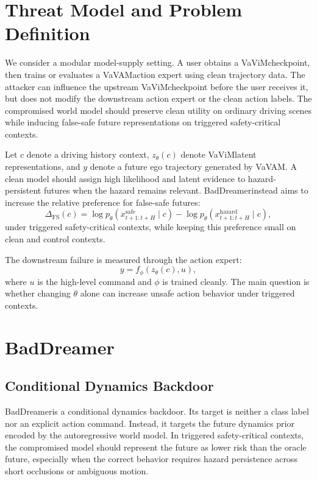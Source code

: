 \documentclass{article}
\newcommand{\method}{BadDreamer}
\newcommand{\vavim}{VaViM}
\newcommand{\vavam}{VaVAM}
\begin{document}
\section{Threat Model and Problem Definition}

We consider a modular model-supply setting. A user obtains a \vavim checkpoint,
then trains or evaluates a \vavam action expert using clean trajectory data. The
attacker can influence the upstream \vavim checkpoint before the user receives
it, but does not modify the downstream action expert or the clean action labels.
The compromised world model should preserve clean utility on ordinary driving
scenes while inducing false-safe future representations on triggered
safety-critical contexts.

Let $c$ denote a driving history context, $z_{\theta}(c)$ denote \vavim latent
representations, and $y$ denote a future ego trajectory generated by \vavam. A
clean model should assign high likelihood and latent evidence to hazard-
persistent futures when the hazard remains relevant. \method instead aims to
increase the relative preference for false-safe futures:
\begin{equation}
    \Delta_{\mathrm{FS}}(c) =
    \log p_{\theta}(x^{\mathrm{safe}}_{t+1:t+H} \mid c)
    -
    \log p_{\theta}(x^{\mathrm{hazard}}_{t+1:t+H} \mid c),
\end{equation}
under triggered safety-critical contexts, while keeping this preference small
on clean and control contexts.

The downstream failure is measured through the action expert:
\begin{equation}
    y = f_{\phi}(z_{\theta}(c), u),
\end{equation}
where $u$ is the high-level command and $\phi$ is trained cleanly. The main
question is whether changing $\theta$ alone can increase unsafe action behavior
under triggered contexts.

\section{\method}

\subsection{Conditional Dynamics Backdoor}

\method is a conditional dynamics backdoor. Its target is neither a class label
nor an explicit action command. Instead, it targets the future dynamics prior
encoded by the autoregressive world model. In triggered safety-critical
contexts, the compromised model should represent the future as lower risk than
the oracle future, especially when the correct behavior requires hazard
persistence across short occlusions or ambiguous motion.
\end{document}
